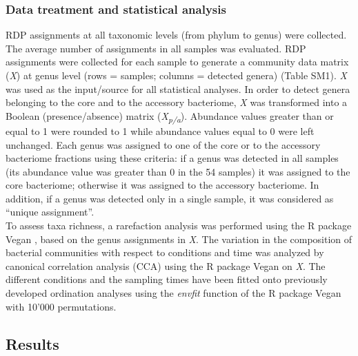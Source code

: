 \subsubsection{Data treatment and statistical analysis}
RDP assignments at all taxonomic levels (from phylum to genus) were collected. The average number of assignments in all samples was evaluated. RDP assignments were collected for each sample to generate a community data matrix (\textit{X}) at genus level (rows = samples; columns = detected genera) (Table SM1). \textit{X} was used as the input/source for all statistical analyses. In order to detect genera belonging to the core and to the accessory bacteriome, \textit{X} was transformed into a Boolean (presence/absence) matrix (\textit{X}\textit{\textsubscript{p/a}}). Abundance values greater than or equal to 1 were rounded to 1 while abundance values equal to 0 were left unchanged. Each genus was assigned to one of the core or to the accessory bacteriome fractions using these criteria: if a genus was detected in all samples (its abundance value was greater than 0 in the 54 samples) it was assigned to the core bacteriome; otherwise it was assigned to the accessory bacteriome. In addition, if a genus was detected only in a single sample, it was considered as ``unique assignment''.\\
To assess taxa richness, a rarefaction analysis was performed using the R package Vegan \cite{oksanen2007vegan, dixon2003vegan}, based on the genus assignments in \textit{X}. The variation in the composition of bacterial communities with respect to conditions and time was analyzed by canonical correlation analysis (CCA) using the R package Vegan on \textit{X}. The different conditions and the sampling times have been fitted onto previously developed ordination analyses using the \textit{envfit} function of the R package Vegan with 10'000 permutations.\\

\subsection{Results}

